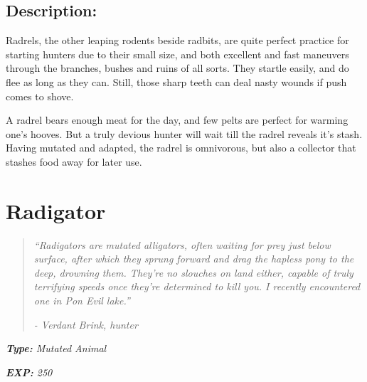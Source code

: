 \documentclass[11pt,a4paper,twocolumn]{book}
\begin{document}
	\subsection*{Description:}
	Radrels, the other leaping rodents beside radbits, are quite perfect practice for starting hunters due to their small size, and both excellent and fast maneuvers through the branches, bushes and ruins of all sorts. They startle easily, and do flee as long as they can. Still, those sharp teeth can deal nasty wounds if push comes to shove.
	
	A radrel bears enough meat for the day, and few pelts are perfect for warming one's hooves. But a truly devious hunter will wait till the radrel reveals it's stash. Having mutated and adapted, the radrel is omnivorous, but also a collector that stashes food away for later use.
	
	\clearpage
	
	\section*{Radigator}
	\begin{quote}
		\emph{``Radigators are mutated alligators, often waiting for prey just below surface, after which they sprung forward and drag the hapless pony to the deep, drowning them. They're no slouches on land either, capable of truly terrifying speeds once they're determined to kill you. I recently encountered one in Pon Evil lake.''}
		
		\emph{-	Verdant Brink, hunter}
	\end{quote}
	
	\emph{\textbf{Type:} Mutated Animal}
	
	\emph{\textbf{EXP:} 250}
%	
%		
%	
%		
\end{document}
